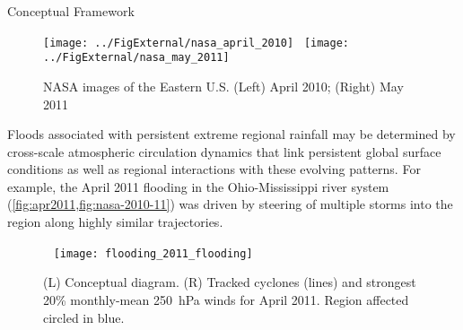 \begin{block}{Conceptual Framework}
    \begin{figure}
        \texttt{[image: ../FigExternal/nasa\_april\_2010]}~
        \texttt{[image: ../FigExternal/nasa\_may\_2011]}
        \caption{NASA images of the Eastern U.S. (Left) April 2010; (Right) May 2011}
        \label{fig:nasa-2010-11}
    \end{figure}
    Floods associated with persistent extreme regional rainfall may be determined by cross-scale atmospheric circulation dynamics that link persistent global surface conditions as well as regional interactions with these evolving patterns.
    For example, the April 2011 flooding in the Ohio-Mississippi river system (\cref{fig:apr2011,fig:nasa-2010-11}) was driven by steering of multiple storms into the region along highly similar trajectories.
    \begin{figure}
        ~\hfill
        \texttt{[image: flooding\_2011\_flooding]}
        \caption{(L) Conceptual diagram. (R) Tracked cyclones (lines) and strongest 20\% monthly-mean \SI{250}{\hecto\pascal} winds for April 2011. Region affected circled in blue.}
        \label{fig:apr2011}
    \end{figure}
\end{block}
